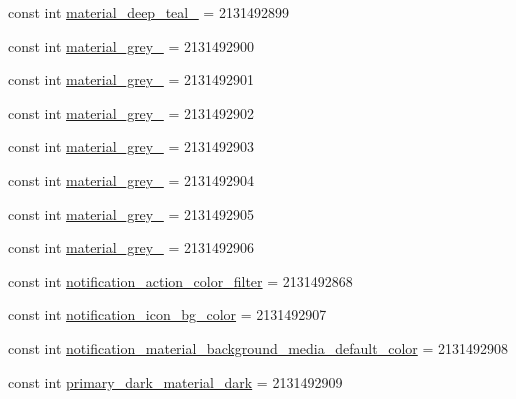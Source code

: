 \begin{DoxyCompactItemize}
\item 
const int \mbox{\hyperlink{class_f_w_p_s___app_1_1_droid_1_1_resource_1_1_color_afc69d427bd44867f46d9e9b22aa99342}{material\+\_\+deep\+\_\+teal\+\_}} = 2131492899
\item 
const int \mbox{\hyperlink{class_f_w_p_s___app_1_1_droid_1_1_resource_1_1_color_abd59b8da7a2dd959a7b2440ed687c7f4}{material\+\_\+grey\+\_}} = 2131492900
\item 
const int \mbox{\hyperlink{class_f_w_p_s___app_1_1_droid_1_1_resource_1_1_color_a3f7162faaaad60ee36167ae368832d6c}{material\+\_\+grey\+\_}} = 2131492901
\item 
const int \mbox{\hyperlink{class_f_w_p_s___app_1_1_droid_1_1_resource_1_1_color_a7f6f7875a8d5c1853993185be739c65a}{material\+\_\+grey\+\_}} = 2131492902
\item 
const int \mbox{\hyperlink{class_f_w_p_s___app_1_1_droid_1_1_resource_1_1_color_abc9cb54130bfd0c27236643d6c73d8ec}{material\+\_\+grey\+\_}} = 2131492903
\item 
const int \mbox{\hyperlink{class_f_w_p_s___app_1_1_droid_1_1_resource_1_1_color_ac8bc92187cec4d2905f4bc1c8f4c865b}{material\+\_\+grey\+\_}} = 2131492904
\item 
const int \mbox{\hyperlink{class_f_w_p_s___app_1_1_droid_1_1_resource_1_1_color_abf967e3b6bfcb601abaf464468d3f0df}{material\+\_\+grey\+\_}} = 2131492905
\item 
const int \mbox{\hyperlink{class_f_w_p_s___app_1_1_droid_1_1_resource_1_1_color_a08cc235138d850ece1c579fb24089d80}{material\+\_\+grey\+\_}} = 2131492906
\item 
const int \mbox{\hyperlink{class_f_w_p_s___app_1_1_droid_1_1_resource_1_1_color_ac6188ef2a7b67a458b9687dd9cdfbc92}{notification\+\_\+action\+\_\+color\+\_\+filter}} = 2131492868
\item 
const int \mbox{\hyperlink{class_f_w_p_s___app_1_1_droid_1_1_resource_1_1_color_a32872e40cb1233e48d1ea38227d191c7}{notification\+\_\+icon\+\_\+bg\+\_\+color}} = 2131492907
\item 
const int \mbox{\hyperlink{class_f_w_p_s___app_1_1_droid_1_1_resource_1_1_color_ae964d96717dd5d5329d367589adbe67f}{notification\+\_\+material\+\_\+background\+\_\+media\+\_\+default\+\_\+color}} = 2131492908
\item 
const int \mbox{\hyperlink{class_f_w_p_s___app_1_1_droid_1_1_resource_1_1_color_a8508d9ac93595704e8ebac70092168cb}{primary\+\_\+dark\+\_\+material\+\_\+dark}} = 2131492909
\item 

\end{DoxyCompactItemize}
